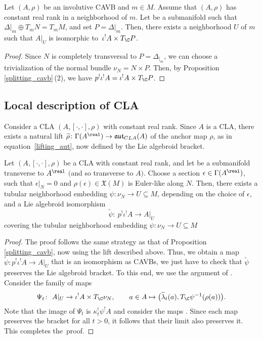 \begin{Corollary}%
Let $(A,\rho)$ be an involutive CAVB and $m\in M$. Assume that $(A,\rho)$ has constant real rank in a neighborhood of $m$. Let  be a submanifold such that $\Delta|_m\oplus T_m N=T_m M$, and set $P=\Delta{|_m}$. Then, there exists a neighborhood $U$ of $m$ such that $A{|_{U}}$ is isomorphic to~${\iota^! A\times T_{\C}P}$.
\end{Corollary}
\begin{proof}
Since $N$ is completely transversal to $P=\Delta_{|_m}$, we can choose a trivialization of the normal bundle $\nu_N=N\times P$. Then, by Proposition \ref{splitting_cavb}\,(2), we have
$p^!\iota^! A=\iota^! A\times T_{\C}P$.
\end{proof}

\subsection{Local description of CLA}%
Consider a CLA $(A, [\cdot,\cdot],\rho)$ with constant real rank. Since $A$ is a CLA, there exists a natural lift
$\widetilde{\rho}\colon \Gamma(A^{\real})\to \mathfrak{aut}_{CLA}(A)$ of the anchor map $\rho$, as in equation~\eqref{lifting_aut}, now defined by the Lie algebroid bracket.
\begin{Theorem}\label{splitting_CLA}
Let $(A,[\cdot,\cdot],\rho)$ be a CLA with constant real rank, and let  be a submanifold transverse to $A^{\real}$ $($and so transverse to $A)$. Choose a section $\epsilon\in \Gamma(A^{\real})$, such that $\epsilon|_N=0$ and $\rho(\epsilon)\in \mathfrak{X}(M)$ is Euler-like along $N$. Then, there exists a tubular neighborhood embedding $\psi\colon \nu_N\to U\subseteq M$, depending on the choice of $\epsilon$, and a Lie algebroid isomorphism
\[
\widetilde{\psi}\colon\ p^{!}\iota^{!}A\to A|_U
\]
  covering the tubular neighborhood embedding $\psi\colon \nu_N\to U\subseteq M$
\end{Theorem}
\begin{proof}
   The proof follows the same strategy as that of Proposition \ref{splitting_cavb}, now using the lift described above. Thus, we obtain a map $\widetilde{\psi}\colon p^{!}\iota^{!}A\xrightarrow{}A|_U$ that is an isomorphism as CAVBs, we just have to check that $\widetilde{\psi}$ preserves the Lie algebroid bracket. To this end, we use the argument of \cite[Remark 3.20]{bursztyn2019splitting}. Consider the family of maps
   \begin{align*}
   \Psi_t\colon \ A|_U \to \iota^! A\times T_{\C}\nu_N,\qquad
   a\in A \mapsto \bigl(\widetilde{\lambda}_t(a), T_{\C}\psi^{-1}(\rho(a))\bigr).
   \end{align*}
    Note that the image of $\Psi_t$ is $\kappa_t^! \psi^! A$ and consider the maps . Since each map  preserves the bracket for all $t>0$, it follows that their limit  also preserves it. This completes the~proof.
\end{proof}
